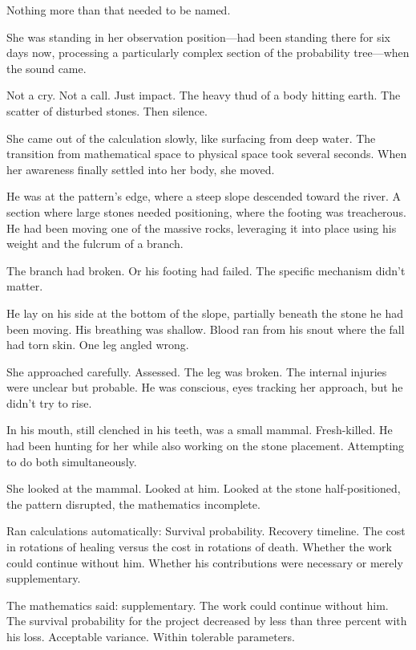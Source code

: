 Nothing more than that needed to be named.

\scenebreak

She was standing in her observation position—had been standing there for six days now, processing a particularly complex section of the probability tree—when the sound came.

Not a cry. Not a call. Just impact. The heavy thud of a body hitting earth. The scatter of disturbed stones. Then silence.

She came out of the calculation slowly, like surfacing from deep water. The transition from mathematical space to physical space took several seconds. When her awareness finally settled into her body, she moved.

He was at the pattern's edge, where a steep slope descended toward the river. A section where large stones needed positioning, where the footing was treacherous. He had been moving one of the massive rocks, leveraging it into place using his weight and the fulcrum of a branch.

The branch had broken. Or his footing had failed. The specific mechanism didn't matter.

He lay on his side at the bottom of the slope, partially beneath the stone he had been moving. His breathing was shallow. Blood ran from his snout where the fall had torn skin. One leg angled wrong.

She approached carefully. Assessed. The leg was broken. The internal injuries were unclear but probable. He was conscious, eyes tracking her approach, but he didn't try to rise.

In his mouth, still clenched in his teeth, was a small mammal. Fresh-killed. He had been hunting for her while also working on the stone placement. Attempting to do both simultaneously.

She looked at the mammal. Looked at him. Looked at the stone half-positioned, the pattern disrupted, the mathematics incomplete.

Ran calculations automatically: Survival probability. Recovery timeline. The cost in rotations of healing versus the cost in rotations of death. Whether the work could continue without him. Whether his contributions were necessary or merely supplementary.

The mathematics said: supplementary. The work could continue without him. The survival probability for the project decreased by less than three percent with his loss. Acceptable variance. Within tolerable parameters.


